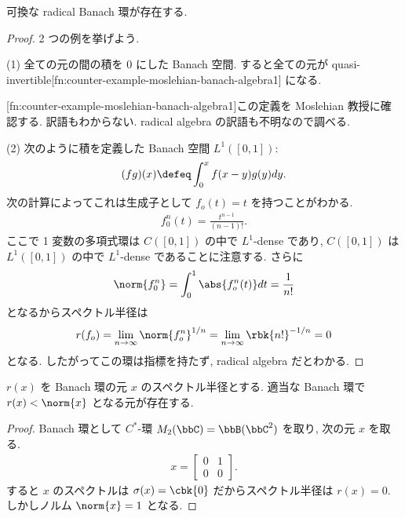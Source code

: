 \documentclass[openany, a4paper, oneside]{jsbook}
\begin{document}
\begin{ex}
可換な radical Banach 環が存在する.
\end{ex}
\begin{proof}
2 つの例を挙げよう.

(1) 全ての元の間の積を 0 にした Banach 空間.
すると全ての元が quasi-invertible[fn:counter-example-moslehian-banach-algebra1] になる.

[fn:counter-example-moslehian-banach-algebra1]この定義を Moslehian 教授に確認する.
訳語もわからない.
radical algebra の訳語も不明なので調べる.


(2) 次のように積を定義した Banach 空間 $L^1([0, 1])$:
\begin{align}
 (fg) (x)
 \defeq
 \int_0^x f(x - y) g(y) dy.
\end{align}
次の計算によってこれは生成子として $f_o (t) = t$ を持つことがわかる.
\begin{align}
 f^n_0 (t)
 =
 \frac{t^{n-1}}{(n-1)!}.
\end{align}
ここで 1 変数の多項式環は $C([0, 1])$ の中で $L^1$-dense であり,
$C([0, 1])$ は $L^1([0, 1])$ の中で $L^1$-dense であることに注意する.
さらに
\begin{align}
 \norm{f_0^n}
 =
 \int_0^1 \abs{f_o^n (t)} dt
 =
 \frac{1}{n!}
\end{align}
となるからスペクトル半径は
\begin{align}
 r(f_o)
 =
 \lim_{n \to \infty} \norm{f_o^n}^{1/n}
 =
 \lim_{n \to \infty} \rbk{n!}^{-1/n}
 = 0
\end{align}
となる.
したがってこの環は指標を持たず, radical algebra だとわかる.
\end{proof}

\begin{ex}
$r(x)$ を Banach 環の元 $x$ のスペクトル半径とする.
適当な Banach 環で $r(x) < \norm{x}$ となる元が存在する.
\end{ex}
\begin{proof}
Banach 環として $C^*$-環 $M_2 (\bbC) = \bbB(\bbC^2)$ を取り,
次の元 $x$ を取る.
\begin{align}
 x
 =
 \begin{bmatrix}
  0 & 1 \\
  0 & 0
 \end{bmatrix}.
\end{align}
すると $x$ のスペクトルは $\sigma (x) = \cbk{0}$ だからスペクトル半径は $r(x) = 0$.
しかしノルム $\norm{x} = 1$ となる.
\end{proof}
\end{document}
